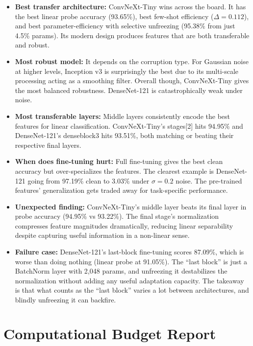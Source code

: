 \documentclass[11pt,a4paper]{article}
\begin{document}
\begin{itemize}
  \item \textbf{Best transfer architecture:} ConvNeXt-Tiny wins across the board. It has the best linear probe accuracy (93.65\%), best few-shot efficiency ($\Delta = 0.112$), and best parameter-efficiency with selective unfreezing (95.38\% from just 4.5\% params). Its modern design produces features that are both transferable and robust.

  \item \textbf{Most robust model:} It depends on the corruption type. For Gaussian noise at higher levels, Inception v3 is surprisingly the best due to its multi-scale processing acting as a smoothing filter. Overall though, ConvNeXt-Tiny gives the most balanced robustness. DenseNet-121 is catastrophically weak under noise.

  \item \textbf{Most transferable layers:} Middle layers consistently encode the best features for linear classification. ConvNeXt-Tiny's stages[2] hits 94.95\% and DenseNet-121's denseblock3 hits 93.51\%, both matching or beating their respective final layers.

  \item \textbf{When does fine-tuning hurt:} Full fine-tuning gives the best clean accuracy but over-specializes the features. The clearest example is DenseNet-121 going from 97.19\% clean to 3.03\% under $\sigma = 0.2$ noise. The pre-trained features' generalization gets traded away for task-specific performance.

  \item \textbf{Unexpected finding:} ConvNeXt-Tiny's middle layer beats its final layer in probe accuracy (94.95\% vs 93.22\%). The final stage's normalization compresses feature magnitudes dramatically, reducing linear separability despite capturing useful information in a non-linear sense.

  \item \textbf{Failure case:} DenseNet-121's last-block fine-tuning scores 87.09\%, which is worse than doing nothing (linear probe at 91.05\%). The ``last block'' is just a BatchNorm layer with 2,048 params, and unfreezing it destabilizes the normalization without adding any useful adaptation capacity. The takeaway is that what counts as the ``last block'' varies a lot between architectures, and blindly unfreezing it can backfire.
\end{itemize}

\section{Computational Budget Report}
\end{document}
